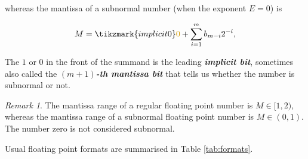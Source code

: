 \documentclass{article}
\theoremstyle{plain} %
\theoremstyle{convention} %
\theoremstyle{remark} %
\newtheorem*{remark}{Remark} %
\def\df#1{\textbf{\textit{#1}}}
\numberwithin{equation}{section}
\begin{document}
whereas the mantissa of a subnormal number (when the exponent $E=0$) is

\begin{align*}
    M = \tikzmark{implicit0}\textcolor{cyellow}{0} + \sum_{i=1}^{m} b_{m-i} 2^{-i},
\end{align*}


The $1$ or $0$ in the front of the summand is the leading \df{\textcolor{cyellow}{implicit bit}}, sometimes also called the \df{$(m+1)$-th mantissa bit} that tells us whether the number is subnormal or not.

\begin{remark}
    The mantissa range of a regular floating point number is $M \in [1, 2)$, whereas the mantissa range of a subnormal floating point number is $M \in (0, 1)$. The number zero is not considered subnormal.
\end{remark}

Usual floating point formats are summarised in Table \ref{tab:formats}.
\end{document}
